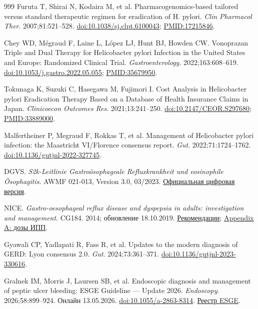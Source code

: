 \documentclass[11pt,a4paper,notitlepage]{report}
\begin{document}
\begin{thebibliography}{999}
 Furuta T, Shirai N, Kodaira M, et al. Pharmacogenomics-based tailored versus standard therapeutic regimen for eradication of H. pylori. \textit{Clin Pharmacol Ther}. 2007;81:521--528. \href{https://doi.org/10.1038/sj.clpt.6100043}{doi:10.1038/sj.clpt.6100043}; \href{https://pubmed.ncbi.nlm.nih.gov/17215846/}{PMID:17215846}.

 Chey WD, Mégraud F, Laine L, López LJ, Hunt BJ, Howden CW. Vonoprazan Triple and Dual Therapy for Helicobacter pylori Infection in the United States and Europe: Randomized Clinical Trial. \textit{Gastroenterology}. 2022;163:608--619. \href{https://doi.org/10.1053/j.gastro.2022.05.055}{doi:10.1053/j.gastro.2022.05.055}; \href{https://pubmed.ncbi.nlm.nih.gov/35679950/}{PMID:35679950}.

 Tokunaga K, Suzuki C, Hasegawa M, Fujimori I. Cost Analysis in Helicobacter pylori Eradication Therapy Based on a Database of Health Insurance Claims in Japan. \textit{Clinicoecon Outcomes Res}. 2021;13:241--250. \href{https://doi.org/10.2147/CEOR.S297680}{doi:10.2147/CEOR.S297680}; \href{https://pubmed.ncbi.nlm.nih.gov/33889000/}{PMID:33889000}.

 Malfertheiner P, Megraud F, Rokkas T, et al. Management of Helicobacter pylori infection: the Maastricht VI/Florence consensus report. \textit{Gut}. 2022;71:1724--1762. \href{https://doi.org/10.1136/gutjnl-2022-327745}{doi:10.1136/gutjnl-2022-327745}.

 DGVS. \textit{S2k-Leitlinie Gastroösophageale Refluxkrankheit und eosinophile Ösophagitis}. AWMF 021-013, Version 3.0, 03/2023. \href{https://www.dgvs.de/leitlinien/oberer-gi-trakt/gastrooesophageale-refluxkrankheit-und-eosinophile-oesophagitis/?digital=1}{Официальная цифровая версия}.

 NICE. \textit{Gastro-oesophageal reflux disease and dyspepsia in adults: investigation and management}. CG184. 2014; обновление 18.10.2019. \href{https://www.nice.org.uk/guidance/cg184/chapter/Recommendations}{Рекомендации}; \href{https://www.nice.org.uk/guidance/cg184/chapter/appendix-a-dosage-information-on-proton-pump-inhibitors}{Appendix A: дозы ИПП}.

 Gyawali CP, Yadlapati R, Fass R, et al. Updates to the modern diagnosis of GERD: Lyon consensus 2.0. \textit{Gut}. 2024;73:361--371. \href{https://doi.org/10.1136/gutjnl-2023-330616}{doi:10.1136/gutjnl-2023-330616}.

 Gralnek IM, Morris J, Laursen SB, et al. Endoscopic diagnosis and management of peptic ulcer bleeding: ESGE Guideline --- Update 2026. \textit{Endoscopy}. 2026;58:899--924. Онлайн 13.05.2026. \href{https://doi.org/10.1055/a-2863-8314}{doi:10.1055/a-2863-8314}. \href{https://www.esge.com/guidelines}{Реестр ESGE}.


\end{thebibliography}
\end{document}
